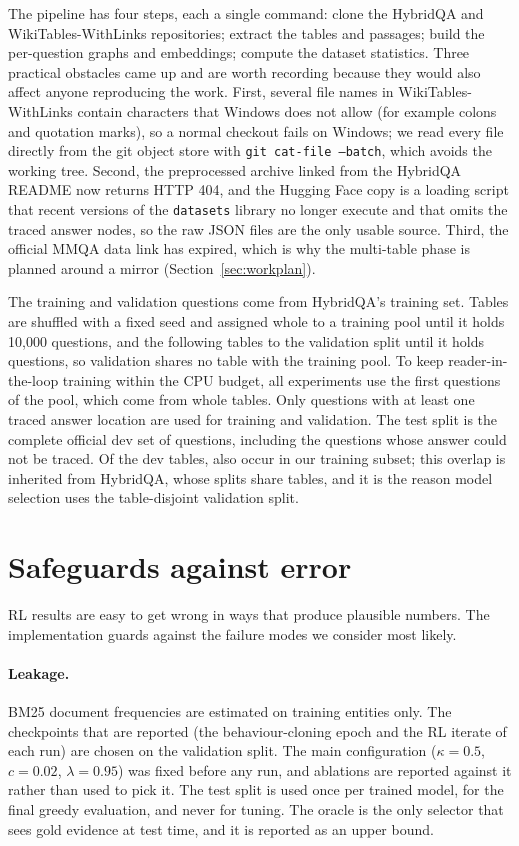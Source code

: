 The pipeline has four steps, each a single command: clone the HybridQA and WikiTables-WithLinks repositories; extract the tables and passages; build the per-question graphs and embeddings; compute the dataset statistics. Three practical obstacles came up and are worth recording because they would also affect anyone reproducing the work. First, several file names in WikiTables-WithLinks contain characters that Windows does not allow (for example colons and quotation marks), so a normal checkout fails on Windows; we read every file directly from the git object store with \texttt{git cat-file --batch}, which avoids the working tree. Second, the preprocessed archive linked from the HybridQA README now returns HTTP 404, and the Hugging Face copy is a loading script that recent versions of the \texttt{datasets} library no longer execute and that omits the traced answer nodes, so the raw JSON files are the only usable source. Third, the official MMQA data link has expired, which is why the multi-table phase is planned around a mirror (Section~\ref{sec:workplan}).

The training and validation questions come from HybridQA's training set. Tables are shuffled with a fixed seed and assigned whole to a training pool until it holds 10{,}000 questions, and the following tables to the validation split until it holds \nVal{} questions, so validation shares no table with the training pool. To keep reader-in-the-loop training within the CPU budget, all experiments use the first \nTrain{} questions of the pool, which come from \nTrainTables{} whole tables. Only questions with at least one traced answer location are used for training and validation. The test split is the complete official dev set of \nTest{} questions, including the questions whose answer could not be traced. Of the \nTestTables{} dev tables, \testTablesInTrain{} also occur in our training subset; this overlap is inherited from HybridQA, whose splits share tables, and it is the reason model selection uses the table-disjoint validation split.

\section{Safeguards against error}

RL results are easy to get wrong in ways that produce plausible numbers. The implementation guards against the failure modes we consider most likely.

\paragraph{Leakage.} BM25 document frequencies are estimated on training entities only. The checkpoints that are reported (the behaviour-cloning epoch and the RL iterate of each run) are chosen on the validation split. The main configuration ($\kappa=0.5$, $c=0.02$, $\lambda=0.95$) was fixed before any run, and ablations are reported against it rather than used to pick it. The test split is used once per trained model, for the final greedy evaluation, and never for tuning. The oracle is the only selector that sees gold evidence at test time, and it is reported as an upper bound.

